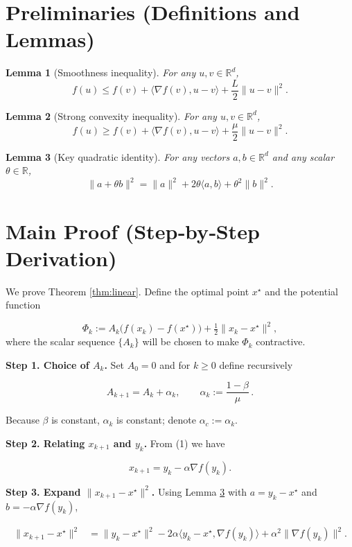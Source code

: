 \documentclass{article}
\newtheorem{lemma}{Lemma}
\begin{document}
\newpage
\section*{Preliminaries (Definitions and Lemmas)}
\begin{lemma}[Smoothness inequality]\label{lem:smooth}
For any $u,v\in\mathbb{R}^{d}$,
\[
f(u)\le f(v)+\langle\nabla f(v),u-v\rangle+\frac{L}{2}\|u-v\|^{2}.
\]
\end{lemma}
\begin{lemma}[Strong convexity inequality]\label{lem:strong}
For any $u,v\in\mathbb{R}^{d}$,
\[
f(u)\ge f(v)+\langle\nabla f(v),u-v\rangle+\frac{\mu}{2}\|u-v\|^{2}.
\]
\end{lemma}
\begin{lemma}[Key quadratic identity]\label{lem:id}
For any vectors $a,b\in\mathbb{R}^{d}$ and any scalar $\theta\in\mathbb{R}$,
\[
\|a+\theta b\|^{2}= \|a\|^{2}+2\theta\langle a,b\rangle+\theta^{2}\|b\|^{2}.
\]
\end{lemma}

\section*{Main Proof (Step‑by‑Step Derivation)}
We prove Theorem \ref{thm:linear}.  
Define the optimal point $x^{\star}$ and the potential function  

\[
\Phi_k:= A_k\bigl(f(x_k)-f(x^{\star})\bigr)+\tfrac12\|x_k-x^{\star}\|^{2},
\tag{4}
\]
where the scalar sequence $\{A_k\}$ will be chosen to make $\Phi_k$ contractive.  

\noindent\textbf{Step 1. Choice of $A_k$.}  
Set $A_0=0$ and for $k\ge0$ define recursively  

\[
A_{k+1}=A_k+\alpha_k,\qquad 
\alpha_k:=\frac{1-\beta}{\mu}\, .\tag{5}
\]

Because $\beta$ is constant, $\alpha_k$ is constant; denote $\alpha_{\!c}:=\alpha_k$.  

\noindent\textbf{Step 2. Relating $x_{k+1}$ and $y_k$.}  
From (1) we have  

\[
x_{k+1}=y_k-\alpha\nabla f(y_k). \tag{6}
\]

\noindent\textbf{Step 3. Expand $\|x_{k+1}-x^{\star}\|^{2}$.}  
Using Lemma \ref{lem:id} with $a=y_k-x^{\star}$ and $b=-\alpha\nabla f(y_k)$,

\[
\begin{aligned}
\|x_{k+1}-x^{\star}\|^{2}
&= \|y_k-x^{\star}\|^{2}
   -2\alpha\langle y_k-x^{\star},\nabla f(y_k)\rangle
   +\alpha^{2}\|\nabla f(y_k)\|^{2}.
\end{aligned}
\tag{7}
\]
\end{document}
